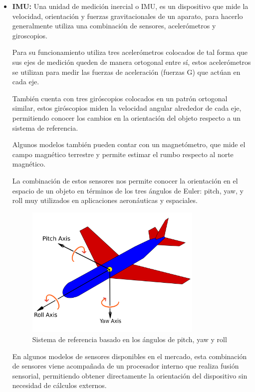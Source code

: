 \begin{itemize}
    \item \textbf{IMU:} Una unidad de medición inercial o IMU, es un dispositivo que mide la velocidad, orientación y fuerzas gravitacionales de un aparato,
    para hacerlo generalmente utiliza una combinación de sensores, acelerómetros y giroscopios.

    Para su funcionamiento utiliza tres acelerómetros colocados de tal forma que sus ejes de medición queden de manera ortogonal entre sí,
    estos acelerómetros se utilizan para medir las fuerzas de aceleración (fuerzas G) que actúan en cada eje.

    También cuenta con tres giróscopios colocados en un patrón ortogonal similar, estos giróscopios miden la velocidad angular alrededor de cada eje, permitiendo conocer los cambios en la orientación del objeto respecto a un sistema de referencia.

    Algunos modelos también pueden contar con un magnetómetro, que mide el campo magnético terrestre y permite estimar el rumbo respecto al norte magnético.

    La combinación de estos sensores nos permite conocer la orientación en el espacio de un objeto en términos de los tres ángulos de Euler: pitch, yaw, y roll muy utilizados en aplicaciones aeronáuticas y espaciales.
    \begin{figure}[h]
        \centering
        \includegraphics[width=0.8\textwidth]{Imagenes/Bitmap/pitch_yaw_roll}
        \caption{Sistema de referencia basado en los ángulos de pitch, yaw y roll}
        \label{fig:pitch_yaw_roll}
    \end{figure}

    En algunos modelos de sensores disponibles en el mercado, esta combinación de sensores viene acompañada de un procesador interno que realiza fusión sensorial,
    permitiendo obtener directamente la orientación del dispositivo sin necesidad de cálculos externos.


\end{itemize}
